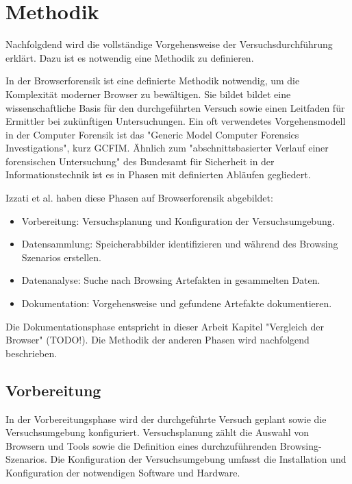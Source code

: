 \chapter{Methodik}

Nachfolgdend wird die vollständige Vorgehensweise der Versuchsdurchführung erklärt.
Dazu ist es notwendig eine Methodik zu definieren.

In der Browserforensik ist eine definierte Methodik notwendig, um die Komplexität moderner Browser zu bewältigen. Sie bildet bildet eine wissenschaftliche Basis für den durchgeführten Versuch sowie einen Leitfaden für Ermittler bei zukünftigen Untersuchungen. \cite{Aggarwal.2010, Izzati.2022, Horsman.2019}	
Ein oft verwendetes Vorgehensmodell in der Computer Forensik ist das "Generic Model Computer Forensics Investigations", kurz GCFIM. \cite{Yusoff.2011}
Ähnlich zum "abschnittsbasierter Verlauf einer forensischen Untersuchung" des Bundesamt für Sicherheit in der Informationstechnik ist es in Phasen mit definierten Abläufen gegliedert.

Izzati et al. haben diese Phasen auf Browserforensik abgebildet: \cite{Izzati.2022}
\begin{itemize}
	\item Vorbereitung: Versuchsplanung und Konfiguration der Versuchsumgebung.
	\item Datensammlung: Speicherabbilder identifizieren und während des Browsing Szenarios erstellen. 
	\item Datenanalyse: Suche nach Browsing Artefakten in gesammelten Daten.
	\item Dokumentation: Vorgehensweise und gefundene Artefakte dokumentieren.
\end{itemize}

Die Dokumentationsphase entspricht in dieser Arbeit Kapitel "Vergleich der Browser" (TODO!). Die Methodik der anderen Phasen wird nachfolgend beschrieben.

\section{Vorbereitung}

In der Vorbereitungsphase wird der durchgeführte Versuch geplant sowie die Versuchsumgebung konfiguriert. \cite{Izzati.2022} Versuchsplanung zählt die Auswahl von Browsern und Tools sowie die Definition eines durchzuführenden Browsing-Szenarios. Die Konfiguration der Versuchsumgebung umfasst die Installation und Konfiguration der notwendigen Software und Hardware.


